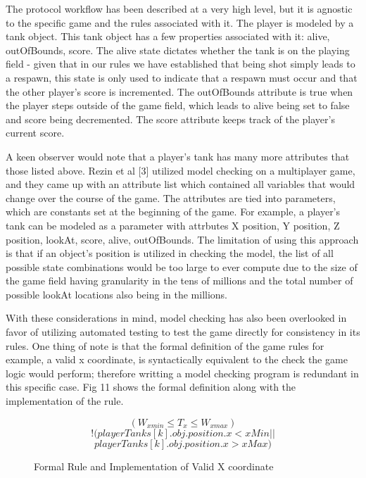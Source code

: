\documentclass[conference]{IEEEtran}
\begin{document}
The protocol workflow has been described at a very high level, but it is agnostic to the specific game and the rules associated with it. The 
player is modeled by a tank object. This tank object has a few properties associated with it: alive, outOfBounds, score. The alive state 
dictates whether the tank is on the playing field - given that in our rules we have established that being shot simply leads to a respawn, 
this state is only used to indicate that a respawn must occur and that the other player's score is incremented. The outOfBounds attribute is true 
when the player steps outside of the game field, which leads to alive being set to false and score being decremented. The score attribute 
keeps track of the player's current score. 

A keen observer would note that a player's tank has many more attributes that those listed above. Rezin et al [3] utilized model checking 
on a multiplayer game, and they came up with an attribute list which contained all variables that would change over the course of the game.
The attributes are tied into parameters, which are constants set at the beginning of the game. For example, a player's tank can be modeled
as a parameter with attrbutes X position, Y position, Z position, lookAt, score, alive, outOfBounds. The limitation of using this approach is that 
if an object's position is utilized in checking the model, the list of all possible state combinations would be too large to ever compute due 
to the size of the game field having granularity in the tens of millions and the total number of possible lookAt locations also being in the millions.

With these considerations in mind, model checking has also been overlooked in favor of utilizing automated testing to test the 
game directly for consistency in its rules. One thing of note is that the formal definition of the game rules for example, a valid x coordinate,
is syntactically equivalent to the check the game logic would perform; therefore writting a model checking program is redundant in this specific 
case. Fig 11 shows the formal definition along with the implementation of the rule.  

\begin{figure}[htbp]
\[ (W_{xmin} \leq T_{x} \leq W_{xmax}) \]
\[ !(playerTanks[k].obj.position.x < xMin ||\]
\[ playerTanks[k].obj.position.x > xMax) \]
\caption{Formal Rule and Implementation of Valid X coordinate}
\end{figure}
\end{document}
